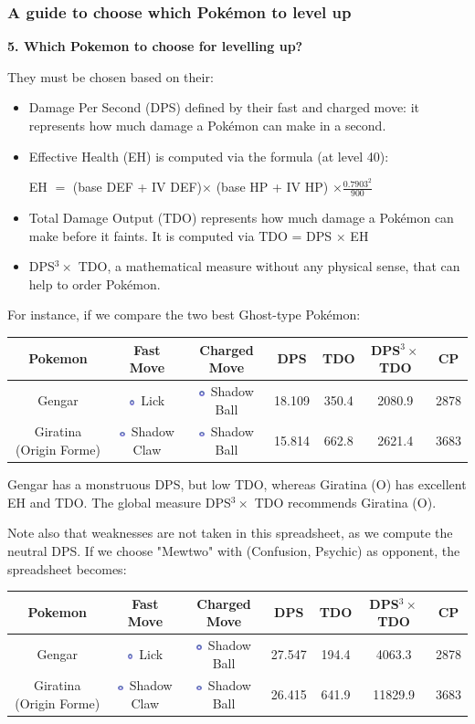 \documentclass[8pt,aspectratio=169,compress]{beamer}
\newcommand{\ghostsimp}{\includegraphics[height=0.15cm]{../../images/type/simplified/ghost.png}}
\begin{document}
\begin{frame}
\frametitle{A guide to choose which Pok\'emon to level up}

\begin{block}{}
\begin{tiny}
\textbf{5. Which Pokemon to choose for levelling up?}

They must be chosen based on their:
\begin{itemize}
  \item Damage Per Second (DPS) defined by their fast and charged move: it represents how much damage a Pok\'emon can make in a second.
  \item Effective Health (EH) is computed via the formula (at level 40):
\begin{center}
EH $=$ (base DEF + IV DEF)$\times$ (base HP + IV HP) $\times \frac{0.7903^2}{900}$
\end{center}
  \item Total Damage Output (TDO) represents how much damage a Pok\'emon can make before it faints. It is computed via TDO = DPS $\times$ EH
  \item  DPS$^3 \times$ TDO, a mathematical measure without any physical sense, that can help to order Pok\'emon.
\end{itemize} 

For instance, if we compare the two best Ghost-type Pokémon:
\begin{center}
\begin{tabular}{ccccccc}
Pokemon & Fast Move & Charged Move & DPS & TDO & DPS$^3 \times$ TDO & CP \\ \hline
Gengar&	\ghostsimp~Lick	&\ghostsimp~Shadow Ball	&18.109	&350.4	&2080.9	&2878\\ 
Giratina (Origin Forme)&	\ghostsimp~Shadow Claw	&\ghostsimp~Shadow Ball&	15.814	&662.8	&2621.4	&3683\\ 
\end{tabular}
\end{center}

Gengar has a monstruous DPS, but low TDO, whereas Giratina (O) has excellent EH and TDO. The global measure  DPS$^3 \times$ TDO recommends Giratina (O).

Note also that weaknesses are not taken in this spreadsheet, as we compute the neutral DPS. If we choose "Mewtwo" with (Confusion, Psychic) as opponent, the spreadsheet becomes:
\begin{center}
\begin{tabular}{ccccccc}
Pokemon & Fast Move & Charged Move & DPS & TDO & DPS$^3 \times$ TDO & CP \\ \hline
Gengar&	\ghostsimp~Lick	&\ghostsimp~Shadow Ball	&27.547& 194.4 & 4063.3& 2878\\ 
Giratina (Origin Forme)&	\ghostsimp~Shadow Claw	&\ghostsimp~Shadow Ball&	26.415	&641.9	&11829.9	&3683\\ 
\end{tabular}
\end{center}


\end{tiny}
\end{block}
\end{frame}
\end{document}
